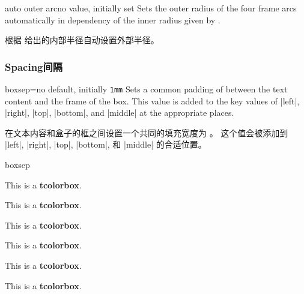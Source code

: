   \begin{docTcbKey}{auto outer arc}{}{no value, initially set}
    Sets the outer radius of the four frame arcs automatically in
    dependency of the inner radius given by .
  
  根据  给出的内部半径自动设置外部半径。
  
  \end{docTcbKey}
  
\subsubsection{Spacing\hfill 间隔}
\begin{docTcbKey}{boxsep}{=}{no default, initially \texttt{1mm}}
  Sets a common padding of  between the text content and the
  frame of the box. This value is added to the key values of
  |left|, |right|, |top|, |bottom|, and |middle| at the appropriate places.

在文本内容和盒子的框之间设置一个共同的填充宽度为 。 这个值会被添加到
  |left|, |right|, |top|, |bottom|, 和 |middle| 的合适位置。
\begin{exdispExample}{boxsep}

\begin{tcolorbox}
This is a \textbf{tcolorbox}.
\end{tcolorbox}
\begin{tcolorbox}[draft]
This is a \textbf{tcolorbox}.
\end{tcolorbox}

\begin{tcolorbox}[boxsep=0mm]
This is a \textbf{tcolorbox}.
\end{tcolorbox}
\begin{tcolorbox}[boxsep=0mm,draft]
This is a \textbf{tcolorbox}.
\end{tcolorbox}

\begin{tcolorbox}[boxsep=5mm]
This is a \textbf{tcolorbox}.
\end{tcolorbox}
\begin{tcolorbox}[boxsep=5mm,draft]
This is a \textbf{tcolorbox}.
\end{tcolorbox}
\end{exdispExample}
\end{docTcbKey}


